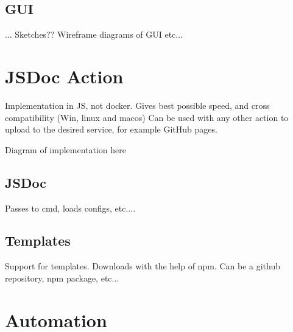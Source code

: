 \subsection{GUI}
... Sketches?? Wireframe diagrams of GUI etc...


\section{JSDoc Action}
Implementation in JS, not docker. Gives best possible speed, and cross compatibility (Win, linux and macos)
Can be used with any other action to upload to the desired service, for example GitHub pages.

\colorbox{RubineRed}{Diagram of implementation here}

\subsection{JSDoc}
Passes to cmd, loads configs, etc....

\subsection{Templates}
Support for templates. Downloads with the help of npm. Can be a github repository, npm package, etc...

\section{Automation}
